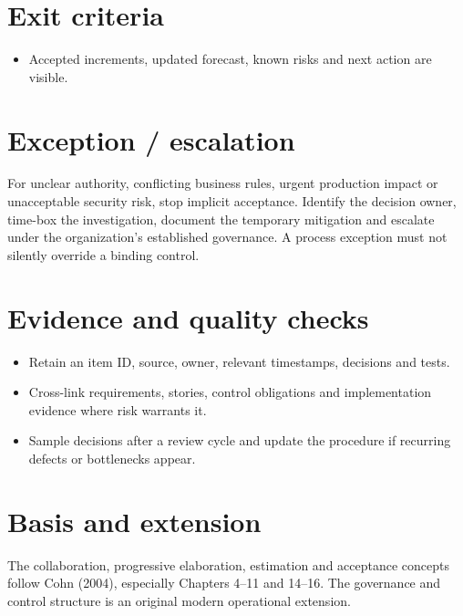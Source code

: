 \documentclass[11pt,letterpaper]{article}
\begin{document}
\section{Exit criteria}
\begin{itemize}[leftmargin=*,itemsep=2pt]
\item Accepted increments, updated forecast, known risks and next action are visible.
\end{itemize}
\section{Exception / escalation}
For unclear authority, conflicting business rules, urgent production impact or unacceptable security risk, stop implicit acceptance. Identify the decision owner, time-box the investigation, document the temporary mitigation and escalate under the organization’s established governance. A process exception must not silently override a binding control.

\section{Evidence and quality checks}
\begin{itemize}[leftmargin=*,itemsep=2pt]
\item Retain an item ID, source, owner, relevant timestamps, decisions and tests.
\item Cross-link requirements, stories, control obligations and implementation evidence where risk warrants it.
\item Sample decisions after a review cycle and update the procedure if recurring defects or bottlenecks appear.
\end{itemize}
\section{Basis and extension}
The collaboration, progressive elaboration, estimation and acceptance concepts follow Cohn (2004), especially Chapters 4–11 and 14–16. The governance and control structure is an original modern operational extension.
\end{document}
